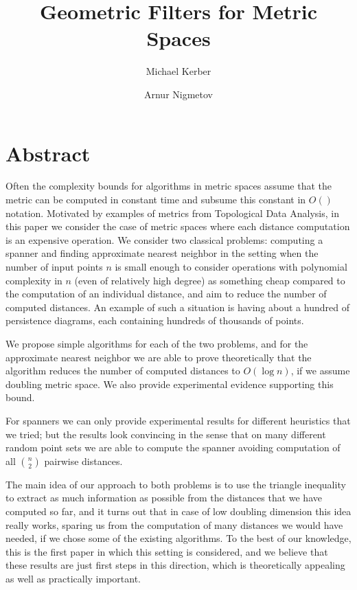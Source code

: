 \documentclass[a4paper,USenglish]{socg-lipics-v2018}
\title{Geometric Filters for Metric Spaces}
\author{Michael Kerber}{TU Graz}{kerber@tugraz.at}{}{}
\author{Arnur Nigmetov}{TU Graz}{nigmetov@tugraz.at}{}{}
\begin{document}
\maketitle

\section{Abstract}
Often the complexity bounds for algorithms in metric spaces
assume that the metric can be computed in constant time and
subsume this constant in $O()$ notation. 
Motivated by examples of metrics from Topological Data Analysis,
in this paper we consider
the case of metric spaces where each distance computation
is an expensive operation.
We consider two classical problems: computing a spanner and finding approximate
nearest neighbor in the setting when the number of input points $n$
is small enough to consider operations with polynomial complexity in $n$ (even of
relatively high degree) as something cheap compared to the computation of an individual distance,
and aim to reduce the number of computed distances.
An example of such a situation is having about a hundred of persistence
diagrams, each containing hundreds of thousands of points.




We propose simple algorithms  for each of the two problems,
and for the approximate nearest neighbor we are able to 
prove theoretically that the algorithm
reduces the number of computed distances to $O(\log n)$,
if we assume doubling metric space.
We also provide experimental evidence supporting this bound.


For spanners we can only provide experimental results for
different heuristics that we tried; but the results look
convincing in the sense that on many different random point
sets we are able to compute the spanner 
avoiding computation of all $n \choose 2$ pairwise distances.


The main idea of our approach to both problems is to use
the triangle inequality to extract as much information as possible
from the distances that we have computed so far, and
it turns out that in case of low doubling dimension
this idea really works, sparing us from the computation
of many distances we would have needed, if we
chose some of the existing algorithms. To the best of our knowledge,
this is the first paper in which this setting is considered,
and we believe that these results are just first
steps in this direction, which is theoretically
appealing as well as practically important.
\end{document}
